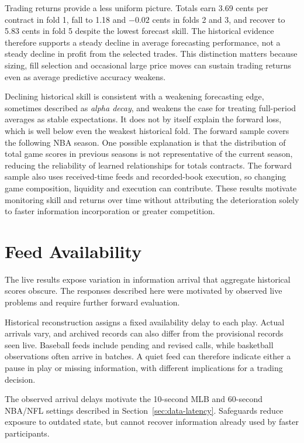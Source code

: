 \documentclass[12pt,a4paper,oneside]{report}
\begin{document}


Trading returns provide a less uniform picture. Totals earn 3.69 cents per contract in
fold 1, fall to 1.18 and $-0.02$ cents in folds 2 and 3, and recover to 5.83 cents in fold 5
despite the lowest forecast skill. The historical evidence therefore supports a steady
decline in average forecasting performance, not a steady decline in profit from the
selected trades. This distinction matters because sizing, fill selection and
occasional large price moves can sustain trading returns even as average predictive
accuracy weakens.

Declining historical skill is consistent with a weakening forecasting edge, sometimes
described as \emph{alpha decay}, and weakens the case for treating full-period averages
as stable expectations. It does not by itself explain the forward loss, which is
well below even the weakest historical fold. The forward sample covers the following
NBA season. One possible explanation is that the distribution of total game scores in
previous seasons is not representative of the current season, reducing the
reliability of learned relationships for totals contracts. The forward sample also
uses received-time feeds and recorded-book execution, so changing game composition,
liquidity and execution can contribute. These results motivate monitoring skill and returns over time
without attributing the deterioration solely to faster information incorporation or
greater competition.


\section{Feed Availability}\label{sec:artefacts}
The live results expose variation in information arrival that aggregate
historical scores obscure. The responses described here were motivated by observed live
problems and require further forward evaluation.

Historical reconstruction assigns a fixed availability delay to each play.
Actual arrivals vary, and archived records can also differ from the provisional
records seen live. Baseball feeds include pending and revised calls, while
basketball observations often arrive in batches. A quiet feed can therefore
indicate either a pause in play or missing information, with different
implications for a trading decision.

The observed arrival delays motivate the 10-second MLB and 60-second NBA/NFL
settings described in Section~\ref{sec:data-latency}. Safeguards reduce exposure
to outdated state, but cannot recover information already used by faster
participants.
\end{document}
